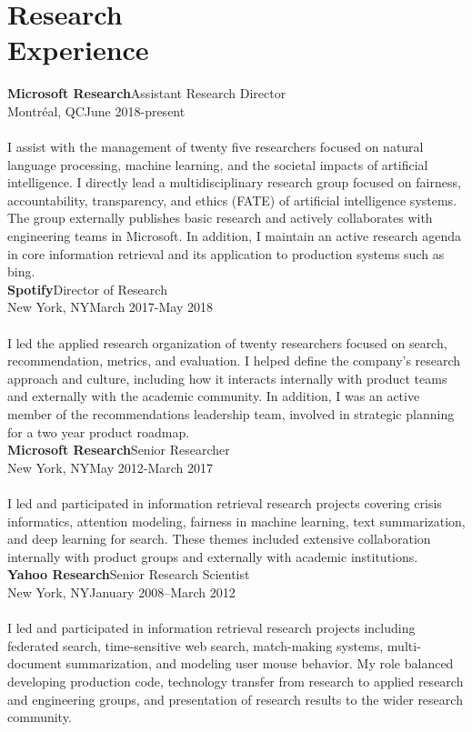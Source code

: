 \documentclass{article}
\begin{document}
\section{Research \\Experience}\noindent\textbf{Microsoft Research}\hfill Assistant Research Director\\
Montréal, QC\hfill June 2018-present\\\\
I assist with the management of twenty five researchers focused on natural language processing, machine learning, and the societal impacts of artificial intelligence.  
I directly lead a multidisciplinary research group focused on fairness, accountability, transparency, and ethics (FATE) of artificial intelligence systems.  The group externally publishes basic research and actively collaborates with engineering teams in Microsoft.  In addition, I maintain an active research agenda in core information retrieval and its application to production systems such as bing. \\

\noindent\textbf{Spotify}\hfill Director of Research\\
New York, NY\hfill March 2017-May 2018\\\\
I led the applied research organization of twenty researchers focused on search, recommendation, metrics, and evaluation.  I helped define the company's research approach and culture, including how it interacts internally with product teams and externally with the academic community.  In addition, I was an active member of the recommendations leadership team, involved in strategic planning for a two year product roadmap.\\

\noindent\textbf{Microsoft Research}\hfill Senior Researcher\\
New York, NY\hfill May 2012-March 2017\\\\
I led and participated in information retrieval research projects covering crisis informatics,  attention modeling, fairness in machine learning, text summarization, and deep learning for search.  These themes included extensive collaboration internally with product groups and externally with academic institutions. \\

\noindent\textbf{Yahoo Research}\hfill Senior Research Scientist\\
New York, NY\hfill January 2008–March 2012\\\\
I led and participated in information retrieval research projects including federated search, time-sensitive web search, match-making systems, multi-document summarization, and modeling user mouse behavior.  My role balanced developing production code, technology transfer from research to applied research and engineering groups, and presentation of research results to the wider research community.  \\
\end{document}
